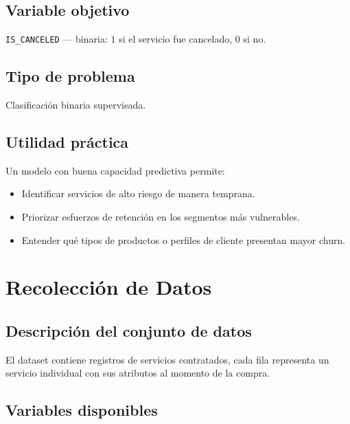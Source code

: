 \documentclass[12pt,letterpaper]{article}
\begin{document}
\subsection{Variable objetivo}
\texttt{IS\_CANCELED} — binaria: $1$ si el servicio fue cancelado, $0$ si no.

\subsection{Tipo de problema}
Clasificación binaria supervisada.

\subsection{Utilidad práctica}
Un modelo con buena capacidad predictiva permite:
\begin{itemize}
  \item Identificar servicios de alto riesgo de manera temprana.
  \item Priorizar esfuerzos de retención en los segmentos más vulnerables.
  \item Entender qué tipos de productos o perfiles de cliente presentan mayor churn.
\end{itemize}

\section{Recolección de Datos}

\subsection{Descripción del conjunto de datos}
El dataset contiene registros de servicios contratados, cada fila representa un servicio
individual con sus atributos al momento de la compra.

\subsection{Variables disponibles}
\end{document}

